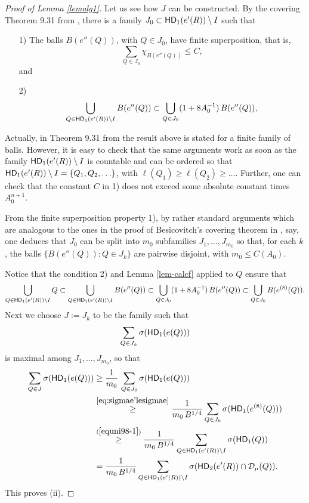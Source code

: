 \begin{proof}[Proof of Lemma \ref{lemalg1}]
Let us see how $J$ can be constructed. By the covering Theorem 9.31 from \cite{Tolsa-llibre}, there
is a family $J_0\subset {\mathsf{HD}}_1(e'(R))\setminus I$ such that
\begin{itemize}
\item[1)] The balls $B(e''(Q))$, with $Q\in J_0$, have finite superposition, that is, 
$$\sum_{Q\in J_0}\chi_{B(e''(Q))}\leq C,$$
and
\item[2)] 
$$\bigcup_{Q\in {\mathsf{HD}}_1(e'(R))\setminus I} B(e''(Q)) \subset \bigcup_{Q\in J_0} (1+8A_0^{-1})\,B(e''(Q)),$$
\end{itemize}
Actually, in Theorem 9.31 from \cite{Tolsa-llibre} the result above is stated for a finite family of
balls. However, it is easy to check that the same arguments work as soon as the family ${\mathsf{HD}}_1(e'(R))\setminus I$ is countable and can be ordered so that ${\mathsf{HD}}_1(e'(R))\setminus I=\{Q_1,Q_2,\ldots\}$,
with $\ell(Q_1)\geq \ell(Q_2)\geq\ldots$. Further, one can check that the constant $C$ in 1)
does not exceed some absolute constant times $A_0^{n+1}$.

From the finite superposition property 1), by rather standard arguments which are analogous to the
ones in the proof of Besicovitch's covering theorem in \cite[Theorem 2.7]{Mattila-llibre}, say, 
one deduces that $J_0$ can be split into $m_0$ subfamilies $J_1,\ldots, J_{m_0}$ so that, for each $k$,  the balls $\{B(e''(Q)): Q\in J_k\}$  are pairwise disjoint, with $m_0\leq C(A_0)$.

Notice that the condition 2) and Lemma \ref{lem-calcf} applied to $Q$ ensure that
\begin{equation}\label{equni98-1}
\bigcup_{Q\in {\mathsf{HD}}_1(e'(R))\setminus I} Q\subset \bigcup_{Q\in {\mathsf{HD}}_1(e'(R))\setminus I} B(e''(Q) )\subset \bigcup_{Q\in J_0} (1+8A_0^{-1})\,B(e''(Q)) \subset \bigcup_{Q\in J_0} B(e^{(8)}(Q)).
\end{equation}
Next we choose $J:=J_k$ to be the family such that
$$\sum_{Q\in J_k}\sigma({\mathsf{HD}}_1(e(Q)))$$
is maximal among $J_1,\ldots,J_{m_0}$, so that
\begin{align*}
\sum_{Q\in J}\sigma(\HD_1(e(Q))) & \geq \frac1{m_0}\,
\sum_{Q\in J_0}\sigma(\HD_1(e(Q)))\\
& \overset{\eqref{eq:sigmae'lesigmae}}{\geq} \frac{1}{m_0\,B^{1/4}} \sum_{Q\in J_0}\sigma(\HD_1(e^{(8)}(Q)))\\
& \overset{\rf{equni98-1}}{\ge} \frac{1}{m_0\,B^{1/4}} \sum_{Q\in \HD_1(e'(R))\setminus I} \sigma(\HD_1(Q))\\
& = \frac{1}{m_0\,B^{1/4}}\sum_{Q\in \HD_1(e'(R))\setminus I} \sigma(\HD_2(e'(R))\cap\DD_\mu(Q)).
\end{align*}
This proves (ii).
\end{proof}
\vv

